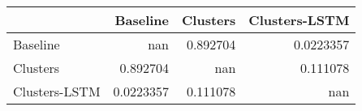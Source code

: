 \begin{tabular}{lrrr}
\toprule
               &    Baseline &   Clusters &   Clusters-LSTM \\
\midrule
 Baseline      & nan         &   0.892704 &       0.0223357 \\
 Clusters      &   0.892704  & nan        &       0.111078  \\
 Clusters-LSTM &   0.0223357 &   0.111078 &     nan         \\
\bottomrule
\end{tabular}
